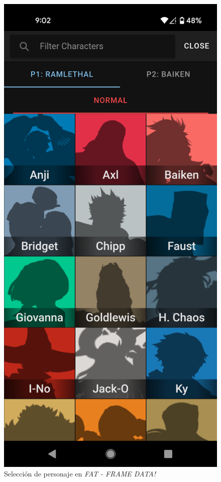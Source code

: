 \begin{figure}
    \centering
    \includegraphics[height=0.4\textheight]{figures/char_sel.png}
    \caption{Selección de personaje en \textit{FAT - FRAME DATA!}}
    \label{fig: char sel}
\end{figure}


